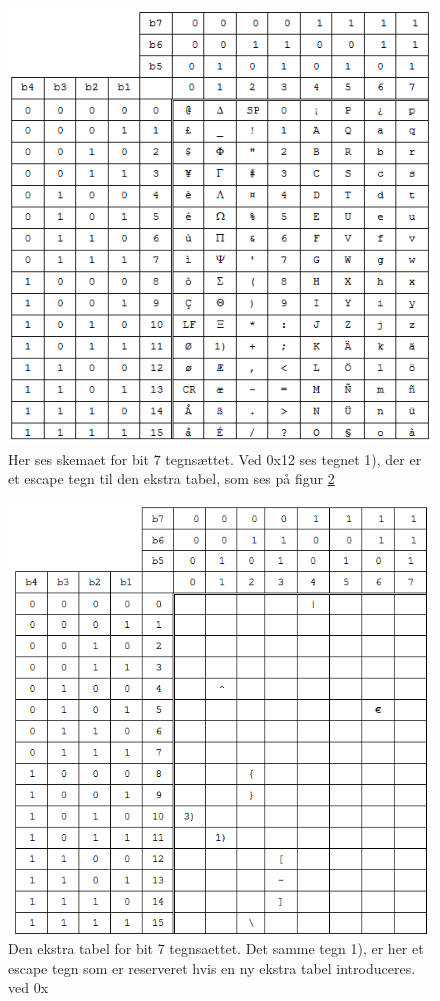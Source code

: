 \begin{figure}[H]
\includegraphics []{Billeder/tegnsaet.png}
\caption {Her ses skemaet for bit 7 tegnsættet. Ved 0x12 ses tegnet 1), der er et escape tegn til den ekstra tabel, som ses på figur \ref{tegnsaet2}}
\label {tegnsaet}
\end{figure}

\begin{figure}[H]
\includegraphics []{Billeder/tegnsaet2.png}
\caption {Den ekstra tabel for bit 7 tegnsaettet. Det samme tegn 1), er her et escape tegn som er reserveret hvis en ny ekstra tabel introduceres. ved 0x}
\label {tegnsaet2}
\end{figure}
